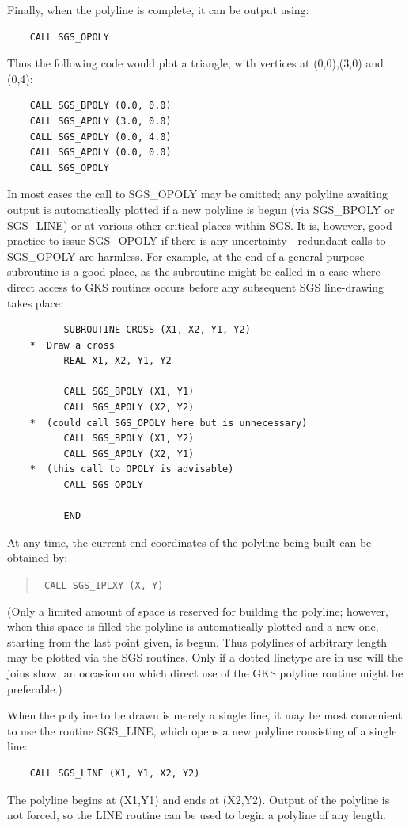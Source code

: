 \documentclass[11pt]{article}
\newcommand{\htmlref}[2]{#1}
\begin{document}
Finally, when the polyline is complete, it can be
output using:
\begin{verbatim}
    CALL SGS_OPOLY
\end{verbatim}
Thus the following code
would plot a triangle, with vertices
at (0,0),(3,0) and (0,4):
\begin{verbatim}
    CALL SGS_BPOLY (0.0, 0.0)
    CALL SGS_APOLY (3.0, 0.0)
    CALL SGS_APOLY (0.0, 4.0)
    CALL SGS_APOLY (0.0, 0.0)
    CALL SGS_OPOLY
\end{verbatim}
In most cases the call to SGS\_OPOLY may be omitted;  any polyline
awaiting output is automatically plotted if a
new polyline is begun (via SGS\_BPOLY or 
\htmlref{SGS\_LINE}{SGS_LINE}) or at
various other critical places within SGS.
It is, however, good practice to issue SGS\_OPOLY if there is
any uncertainty---redundant calls to
SGS\_OPOLY are harmless.  For example, at the end of a general purpose
subroutine is a good
place, as the subroutine might be called in a case where
direct access to GKS routines occurs before any
subsequent SGS line-drawing takes place:
\begin{verbatim}
          SUBROUTINE CROSS (X1, X2, Y1, Y2)
    *  Draw a cross
          REAL X1, X2, Y1, Y2

          CALL SGS_BPOLY (X1, Y1)
          CALL SGS_APOLY (X2, Y2)
    *  (could call SGS_OPOLY here but is unnecessary)
          CALL SGS_BPOLY (X1, Y2)
          CALL SGS_APOLY (X2, Y1)
    *  (this call to OPOLY is advisable)
          CALL SGS_OPOLY

          END
\end{verbatim}           

At any time, the current end coordinates of the polyline being
built can be obtained by:
\begin{quote}{\tt
    CALL \htmlref{SGS\_IPLXY}{SGS_IPLXY} (X, Y)}
\end{quote}
(Only a limited amount of space is reserved for building the
polyline;  however, when this space is filled the polyline is
automatically plotted and a new one, starting from the
last point given, is begun.  Thus polylines of arbitrary length may
be plotted via the SGS routines.  Only if a dotted linetype
are in use will the joins show, an occasion on
which direct use of the GKS polyline routine might be
preferable.)

When the polyline to be drawn is merely a single line, it may be most
convenient to use the routine SGS\_LINE, which opens a new polyline
consisting of a single line:
\begin{verbatim}
    CALL SGS_LINE (X1, Y1, X2, Y2)
\end{verbatim}
The polyline begins at (X1,Y1) and ends at (X2,Y2).  Output 
of the polyline is not forced, so the LINE routine
can be used to begin a polyline of any length.
\end{document}
